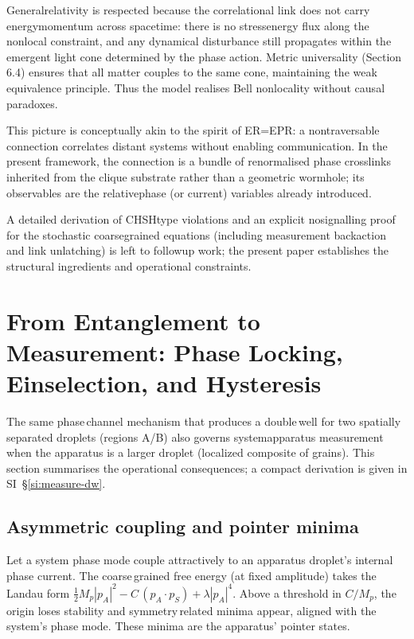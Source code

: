 \documentclass[11pt]{article}
\begin{document}
General\textendash relativity is respected because the correlational link does not carry energy\textendash momentum across spacetime: there is no stress\textendash energy flux along the nonlocal constraint, and any dynamical disturbance still propagates within the emergent light cone determined by the phase action. Metric universality (Section 6.4) ensures that all matter couples to the same cone, maintaining the weak equivalence principle. Thus the model realises Bell nonlocality without causal paradoxes.

This picture is conceptually akin to the spirit of ER=EPR: a nontraversable connection correlates distant systems without enabling communication. In the present framework, the connection is a bundle of renormalised phase cross\textendash links inherited from the clique substrate rather than a geometric wormhole; its observables are the relative\textendash phase (or current) variables already introduced.

A detailed derivation of CHSH\textendash type violations and an explicit no\textendash signalling proof for the stochastic coarse\textendash grained equations (including measurement backaction and link unlatching) is left to follow\textendash up work; the present paper establishes the structural ingredients and operational constraints.

\section{From Entanglement to Measurement: Phase Locking, Einselection, and Hysteresis}
The same phase\,channel mechanism that produces a double\,well for two spatially separated droplets (regions A/B) also governs system\textendash apparatus measurement when the apparatus is a larger droplet (localized composite of grains). This section summarises the operational consequences; a compact derivation is given in SI~\S\ref{si:measure-dw}.

\subsection{Asymmetric coupling and pointer minima}
Let a system phase mode couple attractively to an apparatus droplet's internal phase current. The coarse\,grained free energy (at fixed amplitude) takes the Landau form $\tfrac12 M_p|p_A|^2 - C\,(p_A\!\cdot\!p_S) + \lambda|p_A|^4$. Above a threshold in $C/M_p$, the origin loses stability and symmetry\,related minima appear, aligned with the system's phase mode. These minima are the apparatus' pointer states.
\end{document}
